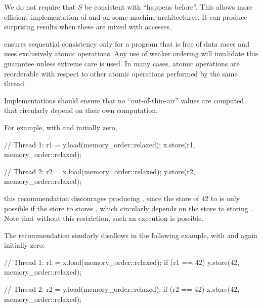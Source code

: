 \pnum
\begin{note}
We do not require that $S$ be consistent with
``happens before''.
This allows more efficient implementation
of  and 
on some machine architectures.
It can produce surprising results
when these are mixed with  accesses.
\end{note}

\pnum
\begin{note}
 ensures sequential consistency only
for a program that is free of data races and
uses exclusively  atomic operations.
Any use of weaker ordering will invalidate this guarantee
unless extreme care is used.
In many cases,  atomic operations are reorderable
with respect to other atomic operations performed by the same thread.
\end{note}

\pnum
Implementations should ensure that no ``out-of-thin-air'' values are computed that
circularly depend on their own computation.

\begin{note}
For example, with  and  initially zero,
\begin{codeblock}
// Thread 1:
r1 = y.load(memory_order::relaxed);
x.store(r1, memory_order::relaxed);
\end{codeblock}

\begin{codeblock}
// Thread 2:
r2 = x.load(memory_order::relaxed);
y.store(r2, memory_order::relaxed);
\end{codeblock}
this recommendation discourages producing , since the store of 42 to  is only
possible if the store to  stores , which circularly depends on the
store to  storing . Note that without this restriction, such an
execution is possible.
\end{note}

\pnum
\begin{note}
The recommendation similarly disallows  in the
following example, with  and  again initially zero:

\begin{codeblock}
// Thread 1:
r1 = x.load(memory_order::relaxed);
if (r1 == 42) y.store(42, memory_order::relaxed);
\end{codeblock}

\begin{codeblock}
// Thread 2:
r2 = y.load(memory_order::relaxed);
if (r2 == 42) x.store(42, memory_order::relaxed);
\end{codeblock}
\end{note}

